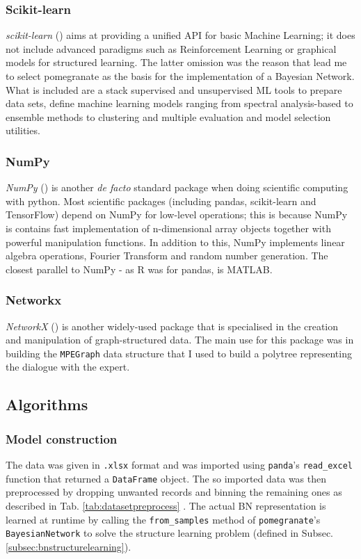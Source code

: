 \subsubsection{Scikit-learn}
\textit{scikit-learn} (\cite{scikitlearn}) aims at providing a unified API for basic Machine Learning; it does not include advanced paradigms such as Reinforcement Learning or graphical models for structured learning.
The latter omission was the reason that lead me to select pomegranate as the basis for the implementation of a Bayesian Network.
What is included are a stack supervised and unsupervised ML tools to prepare data sets, define machine learning models ranging from spectral analysis-based to ensemble methods to clustering and multiple evaluation and model selection utilities.

\subsubsection{NumPy}
\textit{NumPy} (\cite{numpy}) is another \textit{de facto} standard package when doing scientific computing with python.
Most scientific packages (including pandas, scikit-learn and TensorFlow) depend on NumPy for low-level operations; this is because NumPy is contains fast implementation of n-dimensional array objects together with powerful manipulation functions.
In addition to this, NumPy implements linear algebra operations, Fourier Transform and random number generation.
The closest parallel to NumPy - as R was for pandas, is MATLAB.

\subsubsection{Networkx}
\textit{NetworkX} (\cite{networkx}) is another widely-used package that is specialised in the creation and manipulation of graph-structured data.
The main use for this package was in building the \texttt{MPEGraph} data structure that I used to build a polytree representing the dialogue with the expert.

\subsection{Algorithms} 

\subsubsection{Model construction}
The data was given in \texttt{.xlsx} format and was imported using \texttt{panda}'s \texttt{read\_excel} function that returned a \texttt{DataFrame} object.
The so imported data was then preprocessed by dropping unwanted records and binning the remaining ones as described in Tab. \ref{tab:datasetpreprocess} .
The actual BN representation is learned at runtime by calling the \texttt{from\_samples} method of \texttt{pomegranate}'s \texttt{BayesianNetwork} to solve the structure learning problem (defined in Subsec. \ref{subsec:bnstructurelearning}).

